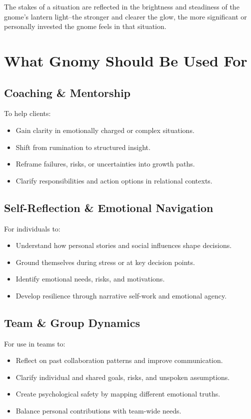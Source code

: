 \documentclass{article}
\begin{document}
The stakes of a situation are reflected in the brightness and steadiness of the gnome’s lantern light--the stronger and clearer the glow, the more significant or personally invested the gnome feels in that situation.

\section{What Gnomy Should Be Used For}

\subsection{Coaching \& Mentorship}
To help clients:
\begin{itemize}[noitemsep,topsep=0pt]
    \item Gain clarity in emotionally charged or complex situations.
    \item Shift from rumination to structured insight.
    \item Reframe failures, risks, or uncertainties into growth paths.
    \item Clarify responsibilities and action options in relational contexts.
\end{itemize}

\subsection{Self-Reflection \& Emotional Navigation}
For individuals to:
\begin{itemize}[noitemsep,topsep=0pt]
    \item Understand how personal stories and social influences shape decisions.
    \item Ground themselves during stress or at key decision points.
    \item Identify emotional needs, risks, and motivations.
    \item Develop resilience through narrative self-work and emotional agency.
\end{itemize}

\subsection{Team \& Group Dynamics}
For use in teams to:
\begin{itemize}[noitemsep,topsep=0pt]
    \item Reflect on past collaboration patterns and improve communication.
    \item Clarify individual and shared goals, risks, and unspoken assumptions.
    \item Create psychological safety by mapping different emotional truths.
    \item Balance personal contributions with team-wide needs.
\end{itemize}
\end{document}
